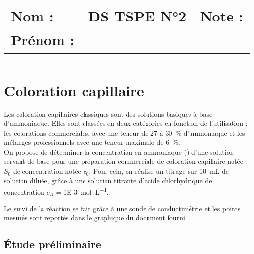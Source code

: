 \documentclass[a4paper,11pt,fleqn]{article}%
\title{\vspace{-1cm}\large 
	\begin{tabular}{|m{5cm}|>{\centering}m{8cm}|>{\centering\arraybackslash}m{4cm}|}
		\hline
		Nom : & \textbf{\textsc{DS TSPE N°2}} &  Note : \\
		Prénom : & & \\\hline
\end{tabular}}
\date{}
\begin{document}
\maketitle
\vspace{-2.5cm}

\section{Coloration capillaire}
Les coloration capillaires classiques sont des solutions basiques à base d'ammoniaque. Elles sont classées en deux catégories en fonction de l'utilisation : les colorations commerciales, avec une teneur de \num{27} à \SI{30}{\percent} d'ammoniaque et les mélanges professionnels avec une teneur maximale de \SI{6}{\percent}.\\

On propose de déterminer la concentration en ammoniaque () d'une solution servant de base pour une préparation commerciale de coloration capillaire notée $S_0$ de concentration notée $c_0$. Pour cela, on réalise un titrage sur \SI{10}{mL} de solution diluée,  grâce à une solution titrante d'acide chlorhydrique  de concentration $c_A$ = \SI{1E-3}{\mole\per\liter}.

Le suivi de la réaction se fait grâce à une sonde de conductimétrie et les points mesurés sont reportés dans le graphique du document fourni.

	\subsection{Étude préliminaire}
\end{document}
